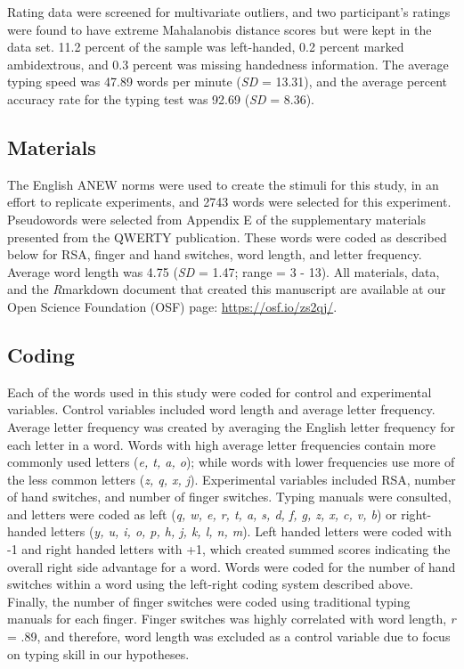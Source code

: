 \documentclass[english,man,man,mask]{apa6}
\theoremstyle{definition}
\theoremstyle{definition}
\theoremstyle{definition}
\theoremstyle{remark}
\begin{document}
Rating data were screened for multivariate outliers, and two
participant's ratings were found to have extreme Mahalanobis distance
scores \autocite{Tabachnick2012} but were kept in the data set. 11.2
percent of the sample was left-handed, 0.2 percent marked ambidextrous,
and 0.3 percent was missing handedness information. The average typing
speed was 47.89 words per minute (\emph{SD} = 13.31), and the average
percent accuracy rate for the typing test was 92.69 (\emph{SD} = 8.36).

\subsection{Materials}\label{materials}

The English ANEW \autocite{Bradley1999} norms were used to create the
stimuli for this study, in an effort to replicate \textcite{Jasmin2012}
experiments, and 2743 words were selected for this experiment.
Pseudowords were selected from Appendix E of the supplementary materials
presented from the QWERTY publication. These words were coded as
described below for RSA, finger and hand switches, word length, and
letter frequency. Average word length was 4.75 (\emph{SD} = 1.47; range
= 3 - 13). All materials, data, and the \emph{R}markdown document that
created this manuscript are available at our Open Science Foundation
(OSF) page: \url{https://osf.io/zs2qj/}.

\subsection{Coding}\label{coding}

Each of the words used in this study were coded for control and
experimental variables. Control variables included word length and
average letter frequency. Average letter frequency was created by
averaging the English letter frequency \autocite{Lewand2000} for each
letter in a word. Words with high average letter frequencies contain
more commonly used letters (\emph{e, t, a, o}); while words with lower
frequencies use more of the less common letters (\emph{z, q, x, j}).
Experimental variables included RSA, number of hand switches, and number
of finger switches. Typing manuals were consulted, and letters were
coded as left (\emph{q, w, e, r, t, a, s, d, f, g, z, x, c, v, b}) or
right-handed letters (\emph{y, u, i, o, p, h, j, k, l, n, m}). Left
handed letters were coded with -1 and right handed letters with +1,
which created summed scores indicating the overall right side advantage
for a word. Words were coded for the number of hand switches within a
word using the left-right coding system described above. Finally, the
number of finger switches were coded using traditional typing manuals
for each finger. Finger switches was highly correlated with word length,
\emph{r} = .89, and therefore, word length was excluded as a control
variable due to focus on typing skill in our hypotheses.
\end{document}
